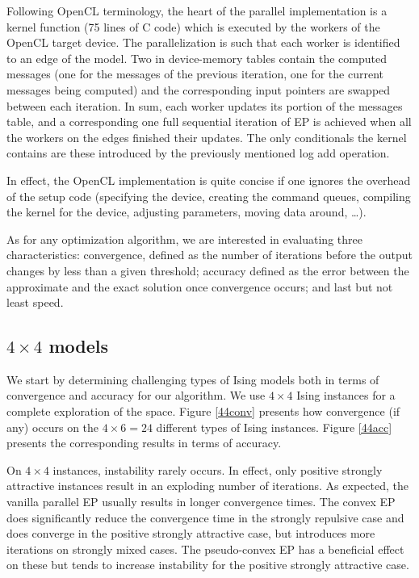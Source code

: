 \documentclass[times, 10pt,twocolumn]{article}
\begin{document}
Following OpenCL terminology, the heart of the parallel implementation is a kernel function (75 lines of C code) which is executed by the workers of the OpenCL target device. The parallelization is such that each worker is identified to an edge of the model. Two in device-memory tables contain the computed messages (one for the messages of the previous iteration, one for the current messages being computed) and the corresponding input pointers are swapped between each iteration. In sum, each worker updates its portion of the messages table, and a corresponding one full sequential iteration of EP is achieved when all the workers on the edges finished their updates. The only conditionals the kernel contains are these introduced by the previously mentioned log add operation.

In effect, the OpenCL implementation is quite concise if one ignores the overhead of the setup code (specifying the device, creating the command queues, compiling the kernel for the device, adjusting parameters, moving data around, \dots).

As for any optimization algorithm, we are interested in evaluating three characteristics: convergence, defined as the number of iterations before the output changes by less than a given threshold; accuracy defined as the error between the approximate and the exact solution once convergence occurs; and last but not least speed.

\subsection{$4 \times 4$ models}
We start by determining challenging types of Ising models both in terms of convergence and accuracy for our algorithm. We use $4 \times 4$ Ising instances for a complete exploration of the space. Figure \ref{44conv} presents how convergence (if any) occurs on the $4 \times 6 = 24$ different types of Ising instances. Figure \ref{44acc} presents the corresponding results in terms of accuracy.


On $4 \times 4$ instances, instability rarely occurs. In effect, only positive strongly attractive instances result in an exploding number of iterations. As expected, the vanilla parallel EP usually results in longer convergence times. The convex EP does significantly reduce the convergence time in the strongly repulsive case and does converge in the positive strongly attractive case, but introduces more iterations on strongly mixed cases. The pseudo-convex EP has a beneficial effect on these but tends to increase instability for the positive strongly attractive case.
\end{document}
